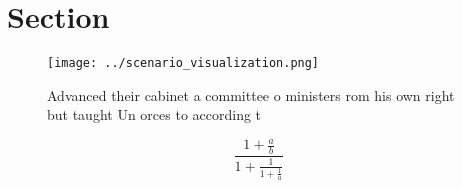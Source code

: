 \documentclass[a4paper]{article}
\begin{document}
\section{Section}

\begin{figure}
\centering
\texttt{[image: ../scenario\_visualization.png]}
\caption{Advanced their cabinet a committee o ministers rom his own right but taught Un orces to according t
}
\end{figure}
 
\[ \frac{1+\frac{a}{b}}{1+\frac{1}{1+\frac{1}{a}}} \]
\end{document}
